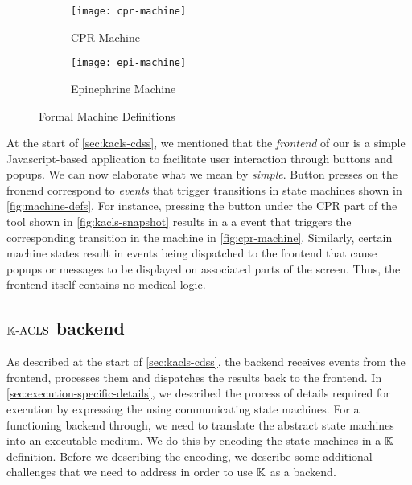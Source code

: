 \begin{figure}[tb!]
\centering
\begin{subfigure}{\textwidth}
  \centering
  \texttt{[image: cpr-machine]}
  \caption{CPR Machine}
  \label{fig:cpr-machine}
\end{subfigure}%
\hfill\newline\hfill\newline\hfill
\begin{subfigure}{\textwidth}
  \centering
  \texttt{[image: epi-machine]}
  \caption{Epinephrine Machine}
  \label{fig:epi-machine}
\end{subfigure}
\caption{Formal Machine Definitions}
\label{fig:machine-defs}
\end{figure}

At the start of \autoref{sec:kacls-cdss}, we mentioned that
the \emph{frontend} of our \CDSS{} is a simple Javascript-based
application to facilitate user interaction through buttons
and popups. We can now elaborate what we mean by \emph{simple}.
Button presses on the fronend correspond to \emph{events}
that trigger transitions in state machines shown in \autoref{fig:machine-defs}.
For instance, pressing the  button under
the CPR part of the tool shown in \autoref{fig:kacls-snapshot} results in a
a  event that triggers the corresponding transition in
the machine in \autoref{fig:cpr-machine}.
Similarly, certain machine states result in events being dispatched
to the frontend that cause popups or messages to be displayed
on associated parts of the screen. Thus, the frontend itself contains
no medical logic.

\subsection{$\mathbb{K}{}\text{-ACLS}$ backend}\label{sec:kacls-backend}

As described at the start of \autoref{sec:kacls-cdss},
the backend receives events from the frontend, processes them and
dispatches the results back to the frontend.
In \autoref{sec:execution-specific-details}, we described the
process of details required for execution by expressing
the \BPG{} using communicating state machines. For a functioning
backend through, we need to translate the abstract state machines
into an executable medium. We do this by encoding the
state machines in a $\mathbb{K}$ definition. Before we describing the
encoding, we describe some additional challenges that we need
to address in order to use $\mathbb{K}$ as a \CDSS{} backend.

